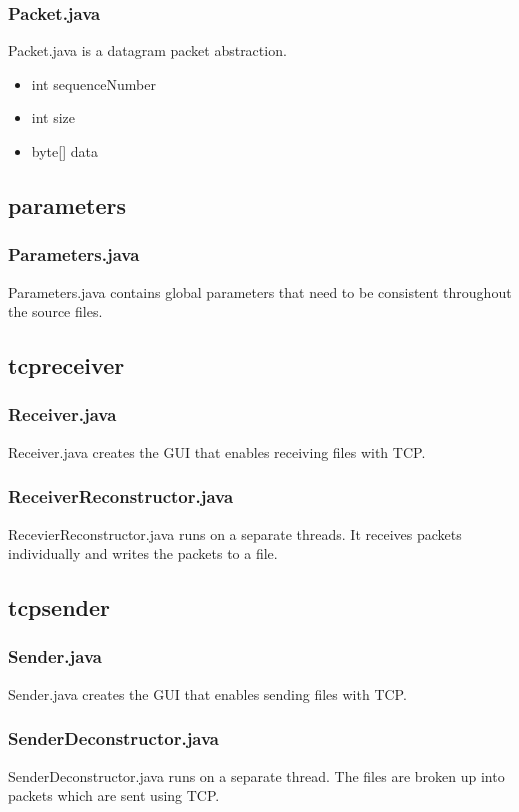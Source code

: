 \documentclass[a4paper,10pt]{article}
\begin{document}
\subsubsection{Packet.java}
Packet.java is a datagram packet abstraction.
\begin{itemize}
	\item int sequenceNumber
	\item int size
	\item byte[] data
\end{itemize}

\subsection{parameters}
\subsubsection{Parameters.java}
Parameters.java contains global parameters that need to be consistent
throughout the source files.

\subsection{tcpreceiver}
\subsubsection{Receiver.java}
Receiver.java creates the GUI that enables receiving files with TCP.
\subsubsection{ReceiverReconstructor.java}
RecevierReconstructor.java runs on a separate threads. It receives packets
individually and writes the packets to a file.

\subsection{tcpsender}
\subsubsection{Sender.java}
Sender.java creates the GUI that enables sending files with TCP.
\subsubsection{SenderDeconstructor.java}
SenderDeconstructor.java runs on a separate thread. The files are broken up
into packets which are sent using TCP.
\end{document}

